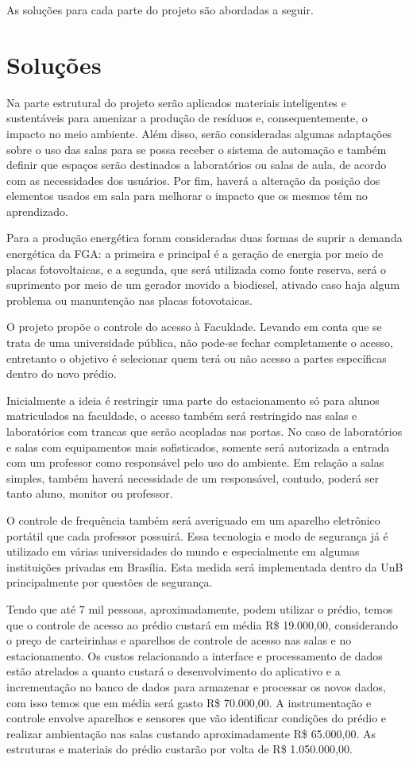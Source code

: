 As soluções para cada parte do projeto são abordadas a seguir.

\section{Soluções}

Na parte estrutural do projeto serão aplicados materiais inteligentes e
sustentáveis para amenizar a produção de resíduos e, consequentemente, o impacto
no meio ambiente. Além disso, serão consideradas algumas adaptações sobre o uso
das salas para se possa receber o sistema de automação e também definir que espaços serão
destinados a laboratórios ou salas de aula, de acordo com as necessidades dos
usuários. Por fim, haverá a alteração da posição dos elementos usados em sala
para melhorar o impacto que os mesmos têm no aprendizado.

Para a produção energética foram consideradas duas formas de suprir a demanda
energética da FGA: a primeira e principal é a geração de energia por meio de
placas fotovoltaicas, e a segunda, que será utilizada como fonte reserva, será
o suprimento por meio de um gerador movido a biodiesel, ativado caso haja algum
problema ou manuntenção nas placas fotovotaicas.

O projeto propõe o controle do acesso à Faculdade. Levando em conta que se trata de uma
universidade pública, não pode-se fechar completamente o acesso,
entretanto o objetivo é selecionar quem terá ou não acesso a partes
específicas dentro do novo prédio.

Inicialmente a ideia é restringir uma parte do estacionamento só para alunos
matriculados na faculdade, o acesso também será restringido nas salas e laboratórios com trancas que serão acopladas
nas portas. No caso de laboratórios e salas com equipamentos mais sofisticados,
somente será autorizada a entrada com um professor como responsável pelo uso do
ambiente. Em relação a salas simples, também haverá necessidade de um
responsável, contudo, poderá ser tanto aluno, monitor ou professor.

O controle de frequência também será averiguado em um aparelho eletrônico portátil
que cada professor possuirá. Essa tecnologia e modo de segurança já é utilizado
em várias universidades do mundo e especialmente em algumas instituições privadas
em Brasília. Esta medida será implementada dentro da UnB
principalmente por questões de segurança.

Tendo que até 7 mil pessoas, aproximadamente, podem utilizar o prédio, temos que o controle de
acesso ao prédio custará em média R\$ 19.000,00, considerando o preço de
carteirinhas e aparelhos de controle de acesso nas salas e no estacionamento. Os
custos relacionando a interface e processamento de dados estão atrelados a
quanto custará o desenvolvimento do aplicativo e a incrementação no banco de
dados para armazenar e processar os novos dados, com isso temos que em média
será gasto R\$ 70.000,00. A instrumentação e controle envolve aparelhos e sensores que vão identificar
condições do prédio e realizar ambientação nas salas custando aproximadamente
R\$ 65.000,00. As estruturas e materiais do prédio custarão por volta de
R\$ 1.050.000,00.

